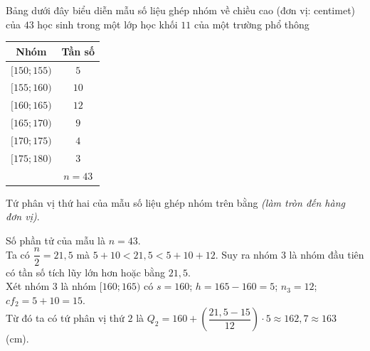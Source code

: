 \begin{bt}%
	Bảng dưới đây biểu diễn mẫu số liệu ghép nhóm về chiều cao (đơn vị: centimet) của $43$ học sinh trong một lớp học khối $11$ của một trường phổ thông 
	\begin{center}
		\begin{tabular}{|c|c|}
			\hline
			Nhóm & Tần số \\
			\hline
			$[150;155)$ & $5$ \\
			\hline
			$[155;160)$ & $10$ \\
			\hline
			$[160;165)$ & $12$ \\
			\hline
			$[165;170)$ & $9$ \\
			\hline
			$[170;175)$ & $4$ \\
			\hline
			$[175;180)$ & $3$ \\
			\hline
			& $n=43$ \\
			\hline
		\end{tabular}
	\end{center}	
	Tứ phân vị thứ hai của mẫu số liệu ghép nhóm trên bằng \textit{(làm tròn đến hàng đơn vị)}.
	
	\loigiai
	{
		Số phần tử của mẫu là $n=43$.\\
		Ta có $\dfrac{n}{2}=21{,}5$ mà $5+10< 21{,}5< 5+10+12$. Suy ra nhóm $3$ là nhóm đầu tiên có tần số tích lũy lớn hơn hoặc bằng $21{,}5$.\\
		Xét nhóm $3$ là nhóm $[160;165)$ có $s=160$; $h=165-160=5$; $n_3=12$; $cf_2=5+10=15$.\\
		Từ đó ta có tứ phân vị thứ $2$ là  $Q_2=160+\left(\dfrac{21{,}5-15}{12} \right)\cdot 5\approx 162{,}7\approx 163$ \,(cm).
	}
\end{bt}

